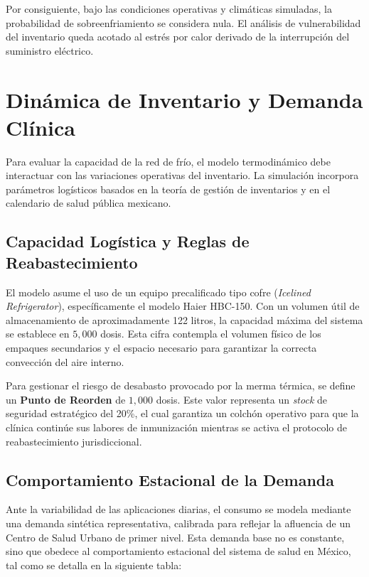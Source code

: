 \documentclass[
  spanish,
  us-letterpaper,
]{scrreprt}
\numberwithin{equation}{section}
\theoremstyle{plain}
\theoremstyle{plain}
\theoremstyle{definition}
\theoremstyle{plain}
\theoremstyle{remark}
\begin{document}
Por consiguiente, bajo las condiciones operativas y climáticas
simuladas, la probabilidad de sobreenfriamiento se considera nula. El
análisis de vulnerabilidad del inventario queda acotado al estrés por
calor derivado de la interrupción del suministro eléctrico.

\section{Dinámica de Inventario y Demanda
Clínica}\label{sec-dinamica-inventario}

Para evaluar la capacidad de la red de frío, el modelo termodinámico
debe interactuar con las variaciones operativas del inventario. La
simulación incorpora parámetros logísticos basados en la teoría de
gestión de inventarios y en el calendario de salud pública mexicano.

\subsection{Capacidad Logística y Reglas de
Reabastecimiento}\label{capacidad-loguxedstica-y-reglas-de-reabastecimiento}

El modelo asume el uso de un equipo precalificado tipo cofre
(\emph{Icelined Refrigerator}), específicamente el modelo Haier HBC-150.
Con un volumen útil de almacenamiento de aproximadamente 122 litros, la
capacidad máxima del sistema se establece en \(5,000\) dosis. Esta cifra
contempla el volumen físico de los empaques secundarios y el espacio
necesario para garantizar la correcta convección del aire interno.

Para gestionar el riesgo de desabasto provocado por la merma térmica, se
define un \textbf{Punto de Reorden} de \(1,000\) dosis. Este valor
representa un \emph{stock} de seguridad estratégico del 20\%, el cual
garantiza un colchón operativo para que la clínica continúe sus labores
de inmunización mientras se activa el protocolo de reabastecimiento
jurisdiccional.

\subsection{Comportamiento Estacional de la
Demanda}\label{comportamiento-estacional-de-la-demanda}

Ante la variabilidad de las aplicaciones diarias, el consumo se modela
mediante una demanda sintética representativa, calibrada para reflejar
la afluencia de un Centro de Salud Urbano de primer nivel. Esta demanda
base no es constante, sino que obedece al comportamiento estacional del
sistema de salud en México, tal como se detalla en la siguiente tabla:
\end{document}
